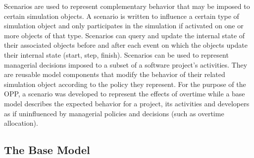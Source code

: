\documentclass[conference]{IEEEtran}
\begin{document}
Scenarios are used to represent complementary behavior that may be imposed to certain simulation objects. A scenario is written to influence a certain type of simulation object and only participates in the simulation if activated on one or more objects of that type. Scenarios can query and update the internal state of their associated objects before and after each event on which the objects update their internal state (start, step, finish). Scenarios can be used to represent managerial decisions imposed to a subset of a software project's activities. They are reusable model components that modify the behavior of their related simulation object according to the policy they represent. For the purpose of the OPP, a scenario was developed to represent the effects of overtime while a base model describes the expected behavior for a project, its activities and developers as if uninfluenced by managerial policies and decisions (such as overtime allocation).


\subsection{The Base Model}
\end{document}
